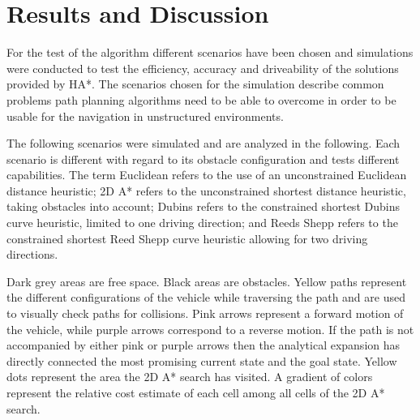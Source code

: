 \chapter{Results and Discussion}\label{chap:resultsAndDiscussion}
For the test of the algorithm different scenarios have been chosen and simulations were conducted to test the efficiency, accuracy and driveability of the solutions provided by HA*. The scenarios chosen for the simulation describe common problems path planning algorithms need to be able to overcome in order to be usable for the navigation in unstructured environments.

The following scenarios were simulated and are analyzed in the following. Each scenario is different with regard to its obstacle configuration and tests different capabilities. The term Euclidean refers to the use of an unconstrained Euclidean distance heuristic; 2D A* refers to the unconstrained shortest distance heuristic, taking obstacles into account; Dubins refers to the constrained shortest Dubins curve heuristic, limited to one driving direction; and Reeds Shepp refers to the constrained shortest Reed Shepp curve heuristic allowing for two driving directions.

Dark grey areas are free space. Black areas are obstacles. Yellow paths represent the different configurations of the vehicle while traversing the path and are used to visually check paths for collisions. Pink arrows represent a forward motion of the vehicle, while purple arrows correspond to a reverse motion. If the path is not accompanied by either pink or purple arrows then the analytical expansion has directly connected the most promising current state and the goal state. Yellow dots represent the area the 2D A* search has visited. A gradient of colors represent the relative cost estimate of each cell among all cells of the 2D A* search.


%
%

